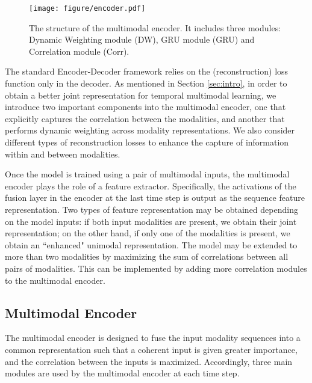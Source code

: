 \documentclass[10pt,twocolumn,letterpaper]{article}
\begin{document}
\begin{figure*}
\begin{center}
\texttt{[image: figure/encoder.pdf]}
\end{center}
\caption{The structure of the multimodal encoder. It includes three modules: Dynamic Weighting module (DW), GRU module (GRU) and Correlation module (Corr).}
\label{fig:encoder}
\vspace{-1em}
\end{figure*}

The standard Encoder-Decoder framework relies on the (reconstruction) loss function only in the decoder. As mentioned in Section \ref{sec:intro}, in order to obtain a better joint representation for temporal multimodal learning, we introduce two important components into the multimodal encoder, one that explicitly captures the correlation between the modalities, and another that performs dynamic weighting across modality representations. We also consider different types of reconstruction losses to enhance the capture of information within and between modalities.

Once the model is trained using a pair of multimodal inputs, the multimodal encoder plays the role of a feature extractor. Specifically, the activations of the fusion layer in the encoder at the last time step is output as the sequence feature representation. Two types of feature representation may be obtained depending on the model inputs: if both input modalities are present, we obtain their joint representation; on the other hand, if only one of the modalities is present, we obtain an ``enhanced" unimodal representation. The model may be extended to more than two modalities by maximizing the sum of correlations between all pairs of modalities. This can be implemented by adding more correlation modules to the multimodal encoder.


\subsection{Multimodal Encoder}
\label{sec:encoder}

The multimodal encoder is designed to fuse the input modality sequences into a common representation such that a coherent input is given greater importance, and the correlation between the inputs is maximized. Accordingly, three main modules are used by the multimodal encoder at each time step.
\end{document}
